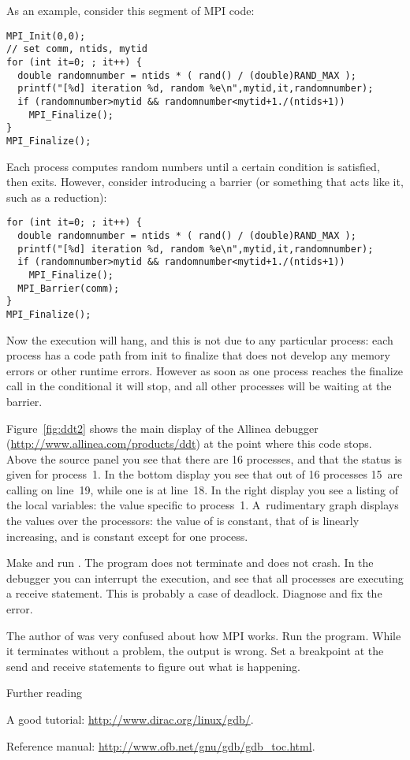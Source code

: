 As an example, consider this segment of MPI code:
\begin{verbatim}
MPI_Init(0,0);
// set comm, ntids, mytid
for (int it=0; ; it++) {
  double randomnumber = ntids * ( rand() / (double)RAND_MAX );
  printf("[%d] iteration %d, random %e\n",mytid,it,randomnumber);
  if (randomnumber>mytid && randomnumber<mytid+1./(ntids+1))  
    MPI_Finalize();
}
MPI_Finalize();
\end{verbatim}
Each process computes random numbers until a certain condition is satisfied, then exits.
However, consider introducing a barrier (or something that acts like it, such as a reduction):
\begin{verbatim}
for (int it=0; ; it++) {
  double randomnumber = ntids * ( rand() / (double)RAND_MAX );
  printf("[%d] iteration %d, random %e\n",mytid,it,randomnumber);
  if (randomnumber>mytid && randomnumber<mytid+1./(ntids+1))  
    MPI_Finalize();
  MPI_Barrier(comm);
}
MPI_Finalize();
\end{verbatim}
Now the execution will hang, and this is not due to any particular process:
each process has a code path from init to finalize that does not develop
any memory errors or other runtime errors.
However as soon as one process reaches the finalize call in the conditional
it will stop, and all other processes will be waiting at the barrier.

Figure~\ref{fig:ddt2} shows the main display of the Allinea 
debugger (\url{http://www.allinea.com/products/ddt}) at the point where this code stops.
Above the source panel you see that there are 16 processes, and that the status is given
for process~1.
In the bottom display you see that out of 16 processes 15~are calling  on line~19,
while one is at line~18. In the right display you see a listing of the local variables:
the value specific to process~1. A~rudimentary graph displays the values over the processors:
the value of  is constant, that of  is linearly increasing, and 
is constant except for one process.

\begin{exercise}
  Make and run . The program does not terminate and does not crash.
  In the debugger you can interrupt the execution, and see that all processes
  are executing a receive statement. This is probably a case of deadlock.
  Diagnose and fix the error.
\end{exercise}

\begin{exercise}
  The author of  was very confused about how MPI works. Run the program.
  While it terminates without a problem, the output is wrong. Set a breakpoint
  at the send and receive statements to figure out what is happening.
\end{exercise}



 {Further reading}

A good tutorial: \url{http://www.dirac.org/linux/gdb/}.

Reference manual: \url{http://www.ofb.net/gnu/gdb/gdb_toc.html}.


